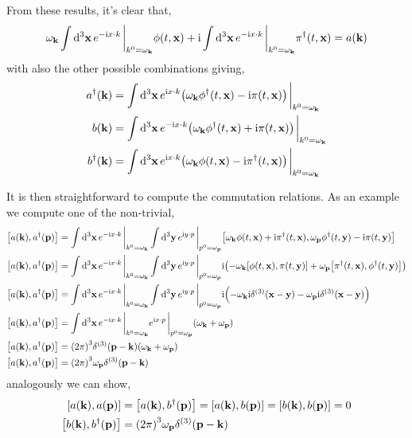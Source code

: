 From these results, it's clear that,
\begin{align}
    \omega_{\vb k}\int\dd[3]{\vb x}e^{-\im x\cdot k}\eval_{k^0=\omega_{\vb k}}\phi\qty(t,\vb x)+\im\int\dd[3]{\vb x}e^{-\im x\cdot k}\eval_{k^0=\omega_{\vb k}}\pi^\dagger\qty(t,\vb x) = a\qty(\vb k)
\end{align}
with also the other possible combinations giving,
\begin{align}
    a^\dagger\qty(\vb k)&=\int\dd[3]{\vb x}e^{\im x\cdot k}\qty(\omega_{\vb k}\phi^\dagger\qty(t,\vb x)-\im\pi\qty(t,\vb x))\eval_{k^0=\omega_{\vb k}}\\
    b\qty(\vb k)&=\int\dd[3]{\vb x}e^{-\im x\cdot k}\qty(\omega_{\vb k}\phi^\dagger\qty(t,\vb x)+\im\pi\qty(t,\vb x))\eval_{k^0=\omega_{\vb k}}\\
    b^\dagger\qty(\vb k)&=\int\dd[3]{\vb x}e^{\im x\cdot k}\qty(\omega_{\vb k}\phi\qty(t,\vb x)-\im\pi^\dagger\qty(t,\vb x))\eval_{k^0=\omega_{\vb k}}
\end{align}

It is then straightforward to compute the commutation relations. As an example we compute one of the non-trivial,
\begin{align}
    \comm{a(\vb k)}{a^\dagger\qty(\vb p)} &=\int\dd[3]{\vb x}e^{-\im x\cdot k}\eval_{k^0=\omega_{\vb k}}\int\dd[3]{\vb y}e^{\im y\cdot p}\eval_{p^0=\omega_{\vb p}}\comm{\omega_{\vb k}\phi\qty(t,\vb x)+\im\pi^\dagger\qty(t,\vb x)}{\omega_{\vb p}\phi^\dagger\qty(t,\vb y)-\im\pi\qty(t,\vb y)}\\
    \comm{a(\vb k)}{a^\dagger\qty(\vb p)} &=\int\dd[3]{\vb x}e^{-\im x\cdot k}\eval_{k^0=\omega_{\vb k}}\int\dd[3]{\vb y}e^{\im y\cdot p}\eval_{p^0=\omega_{\vb p}}\im\qty(-\omega_{\vb k}\comm{\phi\qty(t,\vb x)}{\pi\qty(t,\vb y)}+\omega_{\vb p}\comm{\pi^\dagger\qty(t,\vb x)}{\phi^\dagger\qty(t,\vb y)})\\
    \comm{a(\vb k)}{a^\dagger\qty(\vb p)} &=\int\dd[3]{\vb x}e^{-\im x\cdot k}\eval_{k^0=\omega_{\vb k}}\int\dd[3]{\vb y}e^{\im y\cdot p}\eval_{p^0=\omega_{\vb p}}\im\qty(-\omega_{\vb k}\im\delta^{\qty(3)}\qty(\vb x-\vb y )-\omega_{\vb p}\im\delta^{\qty(3)}\qty(\vb x- \vb y))\\
    \comm{a(\vb k)}{a^\dagger\qty(\vb p)} &=\int\dd[3]{\vb x}e^{-\im x\cdot k}\eval_{k^0=\omega_{\vb k}}e^{\im x\cdot p}\eval_{p^0=\omega_{\vb p}}\qty(\omega_{\vb k}+\omega_{\vb p})\\
    \comm{a(\vb k)}{a^\dagger\qty(\vb p)} &=\qty(2\pi)^3\delta^{\qty(3)}\qty(\vb p -\vb k)\qty(\omega_{\vb k}+\omega_{\vb p})\\
    \comm{a(\vb k)}{a^\dagger\qty(\vb p)} &=\qty(2\pi)^3\omega_{\vb p }\delta^{\qty(3)}\qty(\vb p -\vb k)
\end{align}
analogously we can show,
\begin{align}
    \comm{a(\vb k)}{a\qty(\vb p)}&=\comm{a(\vb k)}{b^\dagger\qty(\vb p)}=\comm{a(\vb k)}{b\qty(\vb p)}=\comm{b(\vb k)}{b\qty(\vb p)}=0\\
    \comm{b(\vb k)}{b^\dagger\qty(\vb p)}&=\qty(2\pi)^3\omega_{\vb p }\delta^{\qty(3)}\qty(\vb p -\vb k)
\end{align}

